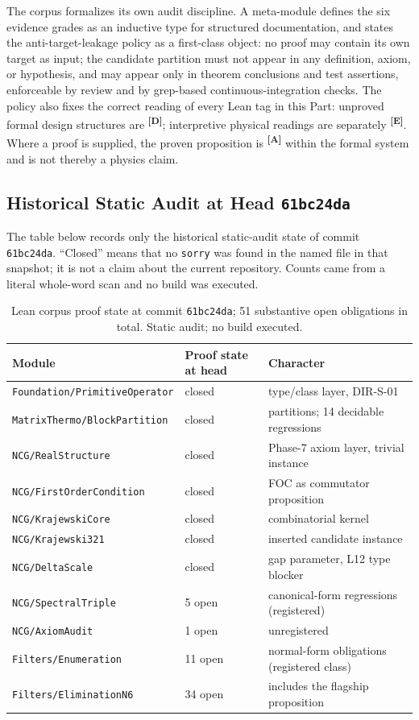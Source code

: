 \documentclass[12pt,a4paper,twoside]{article}
\theoremstyle{plain}
\theoremstyle{definition}
\theoremstyle{remark}
\newcommand{\catmark}[1]{\textsuperscript{\textsf{\textbf{[#1]}}}}
\begin{document}
The corpus formalizes its own audit discipline. A meta-module defines the
six evidence grades as an inductive type for structured documentation, and
states the anti-target-leakage policy as a first-class object: no proof
may contain its own target as input; the candidate partition must not
appear in any definition, axiom, or hypothesis, and may appear only in
theorem conclusions and test assertions, enforceable by review and by
grep-based continuous-integration checks. The policy also fixes the correct reading of every Lean tag in this Part:
unproved formal design structures are \catmark{D}; interpretive physical
readings are separately \catmark{E}. Where a proof is supplied, the proven
proposition is \catmark{A} within the formal system and is not thereby a
physics claim.

\subsection{Historical Static Audit at Head \texttt{61bc24da}}
\label{subsec:formalization-status}

The table below records only the historical static-audit state of commit
\texttt{61bc24da}. ``Closed'' means that no \texttt{sorry} was found in the
named file in that snapshot; it is not a claim about the current repository.
Counts came from a literal whole-word scan and no build was executed.

\begin{table}[H]
\centering\small
\begin{tabular}{@{}llp{5.2cm}@{}}
\toprule
Module & Proof state at head & Character \\
\midrule
\texttt{Foundation/PrimitiveOperator} & closed & type/class layer, DIR-S-01 \\
\texttt{MatrixThermo/BlockPartition} & closed & partitions; 14 decidable regressions \\
\texttt{NCG/RealStructure} & closed & Phase-7 axiom layer, trivial instance \\
\texttt{NCG/FirstOrderCondition} & closed & FOC as commutator proposition \\
\texttt{NCG/KrajewskiCore} & closed & combinatorial kernel \\
\texttt{NCG/Krajewski321} & closed & inserted candidate instance \\
\texttt{NCG/DeltaScale} & closed & gap parameter, L12 type blocker \\
\texttt{NCG/SpectralTriple} & 5 open & canonical-form regressions (registered) \\
\texttt{NCG/AxiomAudit} & 1 open & unregistered \\
\texttt{Filters/Enumeration} & 11 open & normal-form obligations (registered class) \\
\texttt{Filters/EliminationN6} & 34 open & includes the flagship proposition \\
\bottomrule
\end{tabular}
\caption{Lean corpus proof state at commit \texttt{61bc24da}; 51
substantive open obligations in total. Static audit; no build executed.}
\label{tab:lean-status}
\end{table}
\end{document}
